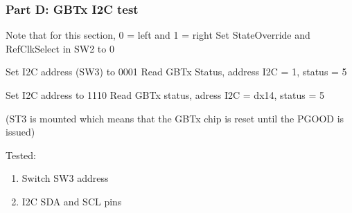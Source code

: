 \subsubsection{Part D: GBTx I2C test}

Note that for this section, 0 = left and 1 = right
Set StateOverride and RefClkSelect in SW2 to 0

Set I2C address (SW3) to 0001
Read GBTx Status, address I2C = 1, status = 5

Set I2C address to 1110
Read GBTx status, adress I2C = dx14, status = 5

(ST3 is mounted which means that the GBTx chip is reset until the PGOOD is issued)

Tested:
\begin{enumerate}
    \item Switch SW3 address
    \item I2C SDA and SCL pins
\end{enumerate}

